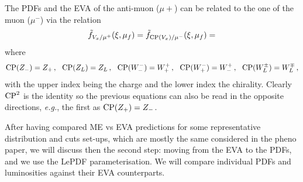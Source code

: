 \documentclass[a4paper,11pt]{article}
\begin{document}
\begin{table}[!t]
\begin{center}
\caption{
EW chiral couplings and coupling strength normalizations used in the EVA for fermions $f,f'$ with weak isospin charge $(T_3^f)_L=\pm1/2$ and electric charge $Q^f$, with normalization $Q^\ell=-1$.
}
\label{tab:ewa_coup}
\end{center}
\end{table}


The PDFs and the EVA of the anti-muon ($\mu+$) can be related to the one of the muon ($\mu^-$) via the relation
%
\begin{equation}
 \tilde{f}_{V_x/\mu^+}(\xi,\mu_f) =  \tilde{f}_{{\rm CP}(V_x)/\mu^-}(\xi,\mu_f) =
\label{eq:muonantimuon}
\end{equation}
%
where 
\begin{equation}
{\rm CP}(Z_-)=Z_+\, , ~~{\rm CP}(Z_L)=Z_L\, , ~~   {\rm CP}(W^-_-)= W^+_+\, , ~~  {\rm CP}(W^-_+)=W^+_- \, , ~~ {\rm CP}(W^\pm_L)= W^\mp_L\, ,
  \end{equation}
with the upper index being the charge and the lower index the chirality. Clearly ${\rm CP}^2$ is the identity so the previous equations can also be read in the opposite directions, {\it e.g.}, the first as ${\rm CP}(Z_+)=Z_-$. 



After having compared ME vs EVA predictions for some representative distribution and cuts set-ups, which are mostly the same considered in the pheno paper, we will discuss then the second step: moving from the EVA to the PDFs, and we use the {\small \sc LePDF} parameterisation.
We will compare individual PDFs and luminosities against their EVA counterparts.
\end{document}
